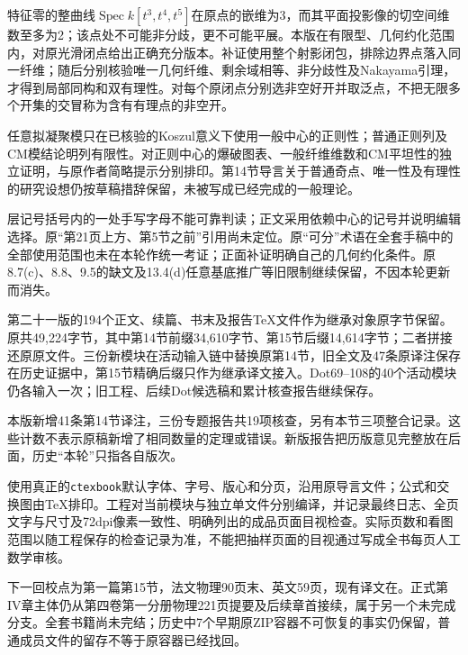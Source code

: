 特征零的整曲线$\operatorname{Spec}k[t^3,t^4,t^5]$在原点的嵌维为3，而其平面投影像的切空间维数至多为2；该点处不可能非分歧，更不可能平展。本版在有限型、几何约化范围内，对原光滑闭点给出正确充分版本。补证使用整个射影闭包，排除边界点落入同一纤维；随后分别核验唯一几何纤维、剩余域相等、非分歧性及Nakayama引理，才得到局部同构和双有理性。对每个原闭点分别选非空好开并取泛点，不把无限多个开集的交冒称为含有有理点的非空开。

任意拟凝聚模只在已核验的Koszul意义下使用一般中心的正则性；普通正则列及CM模结论明列有限性。对正则中心的爆破图表、一般纤维维数和CM平坦性的独立证明，与原作者简略提示分别排印。第14节导言关于普通奇点、唯一性及有理性的研究设想仍按草稿措辞保留，未被写成已经完成的一般理论。

层记号括号内的一处手写字母不能可靠判读；正文采用依赖中心的记号并说明编辑选择。原“第21页上方、第5节之前”引用尚未定位。原“可分”术语在全套手稿中的全部使用范围也未在本轮作统一考证；正面补证明确自己的几何约化条件。原8.7(c)、8.8、9.5的缺文及13.4(d)任意基底推广等旧限制继续保留，不因本轮更新而消失。

第二十一版的194个正文、续篇、书末及报告TeX文件作为继承对象原字节保留。原共49,224字节，其中第14节前缀34,610字节、第15节后缀14,614字节；二者拼接还原原文件。三份新模块在活动输入链中替换原第14节，旧全文及47条原译注保存在历史证据中，第15节精确后缀只作为继承译文接入。Dot69--108的40个活动模块仍各输入一次；旧工程、后续Dot候选稿和累计核查报告继续保存。

本版新增41条第14节译注，三份专题报告共19项核查，另有本节三项整合记录。这些计数不表示原稿新增了相同数量的定理或错误。新版报告把历版意见完整放在后面，历史“本轮”只指各自版次。

使用真正的\texttt{ctexbook}默认字体、字号、版心和分页，沿用原导言文件；公式和交换图由TeX排印。工程对当前模块与独立单文件分别编译，并记录最终日志、全页文字与尺寸及72dpi像素一致性、明确列出的成品页面目视检查。实际页数和看图范围以随工程保存的检查记录为准，不能把抽样页面的目视通过写成全书每页人工数学审核。

下一回校点为第一篇第15节，法文物理90页末、英文59页，现有译文在。正式第IV章主体仍从第四卷第一分册物理221页提要及后续章首接续，属于另一个未完成分支。全套书籍尚未完结；历史中7个早期原ZIP容器不可恢复的事实仍保留，普通成员文件的留存不等于原容器已经找回。
